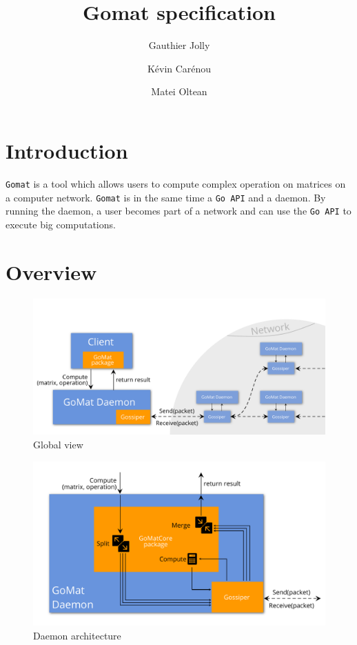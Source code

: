 \documentclass[a4paper,12pt]{article}
\title{Gomat specification}
\author{Gauthier Jolly \and K\'{e}vin Car\'{e}nou \and Matei Oltean}
\newcommand{\Gomat}{\texttt{Gomat}\xspace}
\begin{document}
\maketitle
\tableofcontents
\newpage
    \section{Introduction}
    \Gomat is a tool which allows users to compute complex operation on matrices on a computer network.
    \Gomat is in the same time a \texttt{Go API} and a daemon. By running the daemon, a user becomes part of a network and can use the \texttt{Go API} to execute big computations.

    \section{Overview}
    \begin{figure}[!ht]
        \includegraphics[width=.95\textwidth]{global_view.pdf}
        \caption{Global view}
        \label{glbView}
    \end{figure}
    \begin{figure}[!ht]
        \includegraphics[width=.95\textwidth]{daemon_view.pdf}
        \caption{Daemon architecture}
        \label{daemonView}
    \end{figure}
\end{document}
